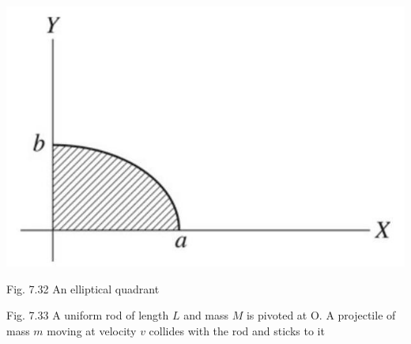 \documentclass[10pt]{article}
\begin{document}
\begin{center}
\includegraphics[max width=\textwidth]{2024_09_13_db1f357d2aad0a03eb2eg-129(1)}
\end{center}

Fig. 7.32 An elliptical quadrant

Fig. 7.33 A uniform rod of length $L$ and mass $M$ is pivoted at O. A projectile of mass $m$ moving at velocity $v$ collides with the rod and sticks to it
\end{document}
